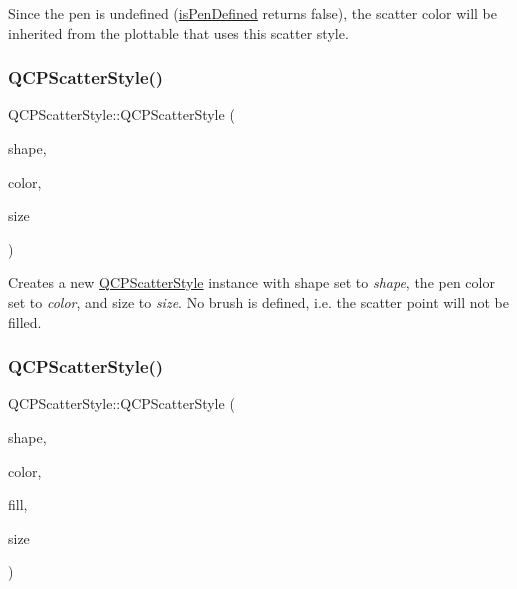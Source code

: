 Since the pen is undefined (\mbox{\hyperlink{class_q_c_p_scatter_style_a47077eb6450fe9a788f833e4ec1b1d5a}{is\+Pen\+Defined}} returns false), the scatter color will be inherited from the plottable that uses this scatter style. \mbox{\label{class_q_c_p_scatter_style_afa059da858c864c7e05871dc602d7eab}} 
\subsubsection{\texorpdfstring{QCPScatterStyle()}{QCPScatterStyle()}\hspace{0.1cm}{\footnotesize\ttfamily [3/7]}}
{\footnotesize\ttfamily Q\+C\+P\+Scatter\+Style\+::\+Q\+C\+P\+Scatter\+Style (\begin{DoxyParamCaption}\item[{\mbox{\hyperlink{class_q_c_p_scatter_style_adb31525af6b680e6f1b7472e43859349}{Scatter\+Shape}}}]{shape,  }\item[{const Q\+Color \&}]{color,  }\item[{double}]{size }\end{DoxyParamCaption})}

Creates a new \mbox{\hyperlink{class_q_c_p_scatter_style}{Q\+C\+P\+Scatter\+Style}} instance with shape set to {\itshape shape}, the pen color set to {\itshape color}, and size to {\itshape size}. No brush is defined, i.\+e. the scatter point will not be filled. \mbox{\label{class_q_c_p_scatter_style_a6e1b64f12cac7f07af180ae4316fd38d}} 
\subsubsection{\texorpdfstring{QCPScatterStyle()}{QCPScatterStyle()}\hspace{0.1cm}{\footnotesize\ttfamily [4/7]}}
{\footnotesize\ttfamily Q\+C\+P\+Scatter\+Style\+::\+Q\+C\+P\+Scatter\+Style (\begin{DoxyParamCaption}\item[{\mbox{\hyperlink{class_q_c_p_scatter_style_adb31525af6b680e6f1b7472e43859349}{Scatter\+Shape}}}]{shape,  }\item[{const Q\+Color \&}]{color,  }\item[{const Q\+Color \&}]{fill,  }\item[{double}]{size }\end{DoxyParamCaption})}

